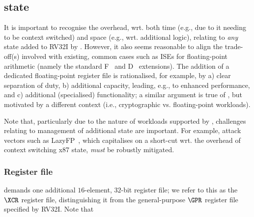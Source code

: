 \subsection{\XCID state}
\label{sec:spec:state}

It is important to recognise the overhead, wrt. both 
time  (e.g., due to it needing to be context switched) 
and 
space (e.g., wrt. additional logic),
relating to {\em any} state added to RV32I by \XCID.
However, it also seems reasonable to align the trade-off(s) involved with 
existing, common cases such as ISEs for floating-point arithmetic (namely
the standard 
F~\cite[Section 8]{SCARV:RV:ISA:I:17}
and
D~\cite[Section 9]{SCARV:RV:ISA:I:17}
extensions).  The addition of a dedicated floating-point register file is
rationalised, for example, by
a) clear separation of duty,
b) additional capacity, leading, e.g., to enhanced performance,
   and
c) additional (specialised) functionality;
a similar argument is true of \XCID, but motivated by a different context
(i.e., cryptographic vs. floating-point workloads).

Note that, particularly due to the nature of workloads supported by \XCID,
challenges relating to management of additional state are important.  For
example, attack vectors such as 
LazyFP~\cite{SCARV:StePre:18}, 
which capitalises on a short-cut wrt. the overhead of context switching
x87 state, {\em must} be robustly mitigated.


\subsubsection{Register file}
\label{sec:spec:state:xcr}

\XCID 
demands one additional 
$16$-element, $32$-bit register file;
we refer to this as the $\XCR$ register file, distinguishing it from the
general-purpose $\GPR$ register file specified by RV32I.
Note that

